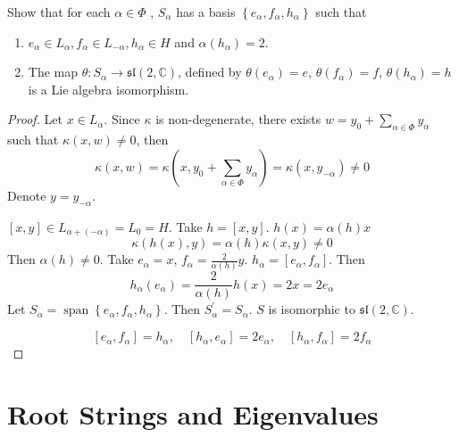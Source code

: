\documentclass[../main.tex]{subfiles}
\begin{document}
\begin{exercise}{}{}
    Show that for each \(  \alpha \in \Phi   \) , \(  S_{\alpha }  \)  has a basis \(  \left\{ e_{\alpha },f_{\alpha },h_{\alpha } \right\}  \) such that 
    \begin{enumerate}
        \item \(  e_{\alpha }\in L_{\alpha }, f_{\alpha }\in L_{-\alpha },h_{\alpha }\in H  \) and \(   \alpha \left( h_{\alpha } \right)= 2   \).
        \item The map \(   \theta :S_{\alpha }\to \mathfrak{sl}\left( 2,\mathbb{C}  \right)   \), defined by \(   \theta \left( e_{\alpha } \right)= e   \), \(   \theta \left( f_{\alpha } \right)= f   \), \(   \theta \left( h_{\alpha } \right)= h   \) is a Lie algebra isomorphism.      
    \end{enumerate}
       
\end{exercise}
\begin{proof}
    Let \(  x\in L_{\alpha }  \). Since \(   \kappa   \) is non-degenerate, there exists \(  w= y_0+ \sum _{\alpha \in \Phi }y_{\alpha }  \) such that \(   \kappa \left( x,w \right)\neq 0   \), then  \[
     \kappa \left( x,w \right)=  \kappa \left( x, y_0+ \sum _{\alpha \in \Phi }y_{\alpha } \right)=  \kappa \left( x, y_{-\alpha } \right)   \neq 0
    \]  Denote \(  y= y_{-\alpha }  \). 
    
  \(  [x,y]\in L_{\alpha + \left( -\alpha  \right) }= L_0= H  \).  Take \(  h= \left[ x,y \right]   \). \(  h\left( x \right)= \alpha \left( h \right)x    \) \[
   \kappa \left( h\left( x \right),y  \right)= \alpha \left( h \right) \kappa \left( x,y \right)\neq 0   
  \]  Then \(  \alpha \left( h \right)\neq 0   \). Take \(  e_{\alpha }= x  \), \(  f_{\alpha }= \frac{2 }{\alpha \left( h \right)  }   y\). \(  h_{\alpha }= [e_{\alpha },f_{\alpha }]\). Then \[
  h_{\alpha }\left( e_{\alpha } \right)= \frac{2 }{\alpha \left( h \right)  }h\left( x \right)= 2x= 2e_{\alpha }   
  \]   Let \(  S_{\alpha }= \operatorname{span}\left\{ e_{\alpha },f_{\alpha },h_{\alpha } \right\}  \). Then \(  S^{\prime}_{\alpha } = S _{\alpha } \). \(  S  \) is isomorphic to    \(  \mathfrak{sl}\left( 2,\mathbb{C}  \right)   \). 

  \[
  [e_{\alpha },f_{\alpha }]= h_{\alpha },\quad [h_{\alpha },e_{\alpha }]= 2e_{\alpha },\quad [h_{\alpha },f_{\alpha }]= 2f_{\alpha }
  \]
\end{proof}

\section{Root Strings and Eigenvalues}
\end{document}
